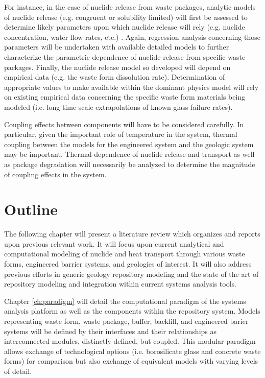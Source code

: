 For instance, in the case of nuclide release from waste packages, 
analytic models of nuclide release (e.g.  congruent or solubility 
limited) will first be assessed to determine likely parameters upon 
which nuclide release will rely (e.g.  nuclide concentration, water 
flow rates, etc.) \cite{kawasaki_congruent_2004}.  Again, regression 
analysis concerning those parameters will be undertaken with available 
detailed models to further characterize the parametric dependence of 
nuclide release from specific waste packages.  Finally, the nuclide 
release model so developed will depend on empirical data (e.g. the 
waste form dissolution rate).  Determination of appropriate values to 
make available within the dominant physics model will rely on existing 
empirical data concerning the specific waste form  materials being 
modeled (i.e. long time scale extrapolations of known glass failure 
rates).  

Coupling effects between components will have to be considered 
carefully.  In particular, given the important role of temperature in 
the system, thermal coupling between the models for the engineered 
system and the geologic system may be important. Thermal dependence of 
nuclide release and transport as well as package degradation will 
necessarily be analyzed to determine the magnitude of coupling effects 
in the system.


\section{Outline}

The following chapter will present a literature review which organizes 
and reports upon previous relevant work. It will focus upon current 
analytical and computational modeling of nuclide and heat transport 
through various waste forms, engineered barrier systems, and geologies 
of interest. It will also address previous efforts in generic geology 
repository modeling and the state of the art of repository modeling 
and integration within current systems analysis tools. 

Chapter \ref{ch:paradigm} will detail the computational paradigm of 
the \Cyclus systems analysis platform as well as the components within 
the repository system. Models
representing waste form, waste package, buffer, backfill, and 
engineered barier systems will be defined by their interfaces and 
their relationships as interconnected modules, distinctly defined, but 
coupled. This modular paradigm allows exchange  of technological 
options (i.e. borosilicate glass and concrete waste forms) for 
comparison but also exchange of equivalent models with varying levels 
of detail.


